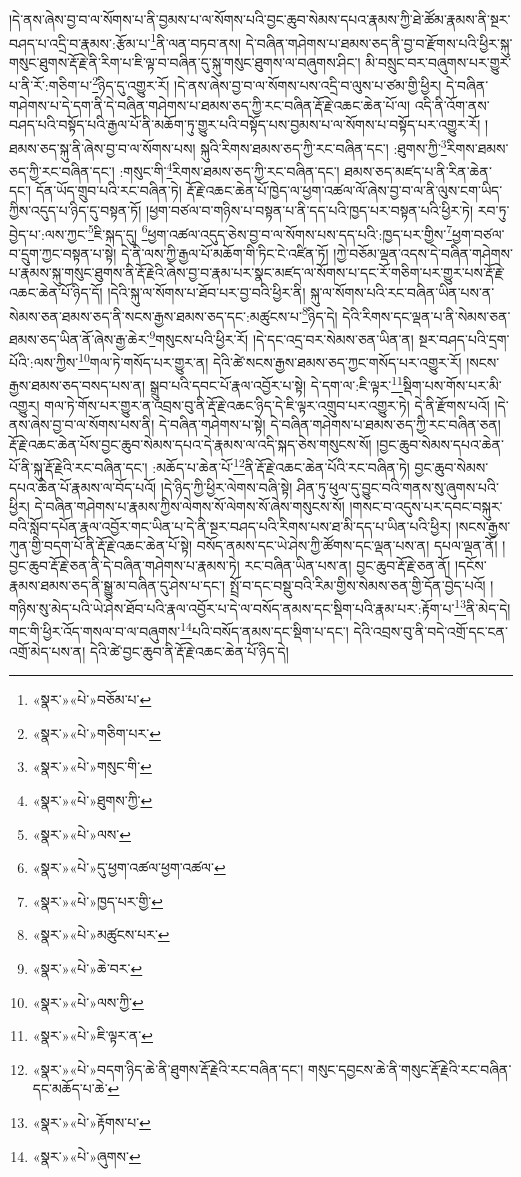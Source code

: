  །དེ་ནས་ཞེས་བྱ་བ་ལ་སོགས་པ་ནི་བྱམས་པ་ལ་སོགས་པའི་བྱང་ཆུབ་སེམས་དཔའ་རྣམས་ཀྱི་ཐེ་ཚོམ་རྣམས་ནི་སྔར་བཤད་པ་འདྲི་བ་རྣམས་:རྩོམ་པ་\footnote{«སྣར་»«པེ་»བཅོམ་པ་}ནི་ལན་བཏབ་ནས། དེ་བཞིན་གཤེགས་པ་ཐམས་ཅད་ནི་བྱ་བ་རྫོགས་པའི་ཕྱིར་སྐུ་གསུང་ཐུགས་རྡོ་རྗེ་ནི་རིག་པ་ཇི་ལྟ་བ་བཞིན་དུ་སྐུ་གསུང་ཐུགས་ལ་བཞུགས་ཤིང་། མི་བསྲུང་བར་བཞུགས་པར་གྱུར་པ་ནི་རོ་:གཅིག་པ་\footnote{«སྣར་»«པེ་»གཅིག་པར་}ཉིད་དུ་འགྱུར་རོ། །དེ་ནས་ཞེས་བྱ་བ་ལ་སོགས་པས་འདྲི་བ་ལུས་པ་ཙམ་གྱི་ཕྱིར། དེ་བཞིན་གཤེགས་པ་དེ་དག་ནི་དེ་བཞིན་གཤེགས་པ་ཐམས་ཅད་ཀྱི་རང་བཞིན་རྡོ་རྗེ་འཆང་ཆེན་པོ་ལ། འདི་ནི་འོག་ནས་བཤད་པའི་བསྟོད་པའི་རྒྱལ་པོ་ནི་མཆོག་ཏུ་གྱུར་པའི་བསྟོད་པས་བྱམས་པ་ལ་སོགས་པ་བསྟོད་པར་འགྱུར་རོ། །ཐམས་ཅད་སྐུ་ནི་ཞེས་བྱ་བ་ལ་སོགས་པས། སྐུའི་རིགས་ཐམས་ཅད་ཀྱི་རང་བཞིན་དང་། :ཐུགས་ཀྱི་\footnote{«སྣར་»«པེ་»གསུང་གི་}རིགས་ཐམས་ཅད་ཀྱི་རང་བཞིན་དང་། :གསུང་གི་\footnote{«སྣར་»«པེ་»ཐུགས་ཀྱི་}རིགས་ཐམས་ཅད་ཀྱི་རང་བཞིན་དང་། ཐམས་ཅད་མཛད་པ་ནི་རིན་ཆེན་དང་། དོན་ཡོད་གྲུབ་པའི་རང་བཞིན་ཏེ། རྡོ་རྗེ་འཆང་ཆེན་པོ་ཁྱེད་ལ་ཕྱག་འཚལ་ལོ་ཞེས་བྱ་བ་ལ་ནི་ལུས་ངག་ཡིད་ཀྱིས་འདུད་པ་ཉིད་དུ་བསྟན་ཏོ། །ཕྱག་བཙལ་བ་གཉིས་པ་བསྟན་པ་ནི་དད་པའི་ཁྱད་པར་བསྟན་པའི་ཕྱིར་ཏེ། རབ་ཏུ་བྱེད་པ་:ལས་ཀྱང་\footnote{«སྣར་»«པེ་»ལས་}ཇི་སྐད་དུ། \footnote{«སྣར་»«པེ་»དུ་ཕྱག་འཚལ་ཕྱག་འཚལ་}ཕྱག་འཚལ་འདུད་ཅེས་བྱ་བ་ལ་སོགས་པས་དད་པའི་:ཁྱད་པར་གྱིས་\footnote{«སྣར་»«པེ་»ཁྱད་པར་གྱི་}ཕྱག་བཙལ་བ་དྲུག་ཀྱང་བསྟན་པ་སྟེ། དེ་ནི་ལས་ཀྱི་རྒྱལ་པོ་མཆོག་གི་ཏིང་ངེ་འཛིན་ཏོ། །ཀྱེ་བཅོམ་ལྡན་འདས་དེ་བཞིན་གཤེགས་པ་རྣམས་སྐུ་གསུང་ཐུགས་ནི་རྡོ་རྗེའི་ཞེས་བྱ་བ་རྣམ་པར་སྣང་མཛད་ལ་སོགས་པ་དང་རོ་གཅིག་པར་གྱུར་པས་རྡོ་རྗེ་འཆང་ཆེན་པོ་ཉིད་དོ། །དེའི་སྐུ་ལ་སོགས་པ་ཐོབ་པར་བྱ་བའི་ཕྱིར་ནི། སྐུ་ལ་སོགས་པའི་རང་བཞིན་ཡིན་པས་ན་སེམས་ཅན་ཐམས་ཅད་ནི་སངས་རྒྱས་ཐམས་ཅད་དང་:མཚུངས་པ་\footnote{«སྣར་»«པེ་»མཚུངས་པར་}ཉིད་དེ། དེའི་རིགས་དང་ལྡན་པ་ནི་སེམས་ཅན་ཐམས་ཅད་ཡིན་ནོ་ཞེས་རྒྱ་ཆེར་\footnote{«སྣར་»«པེ་»ཆེ་བར་}གསུངས་པའི་ཕྱིར་རོ། །དེ་དང་འདྲ་བར་སེམས་ཅན་ཡིན་ན། སྔར་བཤད་པའི་དྲག་པོའི་:ལས་ཀྱིས་\footnote{«སྣར་»«པེ་»ལས་ཀྱི་}གལ་ཏེ་གསོད་པར་གྱུར་ན། དེའི་ཚེ་སངས་རྒྱས་ཐམས་ཅད་ཀྱང་གསོད་པར་འགྱུར་རོ། །སངས་རྒྱས་ཐམས་ཅད་བསད་པས་ན། སྒྲུབ་པའི་དབང་པོ་རྣལ་འབྱོར་པ་སྟེ། དེ་དག་ལ་:ཇི་ལྟར་\footnote{«སྣར་»«པེ་»ཇི་ལྟར་ན་}སྡིག་པས་གོས་པར་མི་འགྱུར། གལ་ཏེ་གོས་པར་གྱུར་ན་འབྲས་བུ་ནི་རྡོ་རྗེ་འཆང་ཉིད་དེ་ཇི་ལྟར་འགྲུབ་པར་འགྱུར་ཏེ། དེ་ནི་རྫོགས་པའོ། །དེ་ནས་ཞེས་བྱ་བ་ལ་སོགས་པས་ནི། དེ་བཞིན་གཤེགས་པ་སྟེ། དེ་བཞིན་གཤེགས་པ་ཐམས་ཅད་ཀྱི་རང་བཞིན་ཅན། རྡོ་རྗེ་འཆང་ཆེན་པོས་བྱང་ཆུབ་སེམས་དཔའ་དེ་རྣམས་ལ་འདི་སྐད་ཅེས་གསུངས་སོ། །བྱང་ཆུབ་སེམས་དཔའ་ཆེན་པོ་ནི་སྐུ་རྡོ་རྗེའི་རང་བཞིན་དང་། :མཆོད་པ་ཆེན་པོ་\footnote{«སྣར་»«པེ་»བདག་ཉིད་ཆེ་ནི་ཐུགས་རྡོ་རྗེའི་རང་བཞིན་དང་། གསུང་དབྱངས་ཆེ་ནི་གསུང་རྡོ་རྗེའི་རང་བཞིན་དང་མཆོད་པ་ཆེ་}ནི་རྡོ་རྗེ་འཆང་ཆེན་པོའི་རང་བཞིན་ཏེ། བྱང་ཆུབ་སེམས་དཔའ་ཆེན་པོ་རྣམས་ལ་བོད་པའོ། །དེ་ཉིད་ཀྱི་ཕྱིར་ལེགས་བཞི་སྟེ། ཤིན་ཏུ་ཕུལ་དུ་བྱུང་བའི་གནས་སུ་ཞུགས་པའི་ཕྱིར། དེ་བཞིན་གཤེགས་པ་རྣམས་ཀྱིས་ལེགས་སོ་ལེགས་སོ་ཞེས་གསུངས་སོ། །གསང་བ་འདུས་པར་དབང་བསྐུར་བའི་སློབ་དཔོན་རྣལ་འབྱོར་གང་ཡིན་པ་དེ་ནི་སྔར་བཤད་པའི་རིགས་པས་ཐ་མི་དད་པ་ཡིན་པའི་ཕྱིར། །སངས་རྒྱས་ཀུན་གྱི་བདག་པོ་ནི་རྡོ་རྗེ་འཆང་ཆེན་པོ་སྟེ། བསོད་ནམས་དང་ཡེ་ཤེས་ཀྱི་ཚོགས་དང་ལྡན་པས་ན། དཔལ་ལྡན་ནོ། །བྱང་ཆུབ་རྡོ་རྗེ་ཅན་ནི་དེ་བཞིན་གཤེགས་པ་རྣམས་ཏེ། རང་བཞིན་ཡིན་པས་ན། བྱང་ཆུབ་རྡོ་རྗེ་ཅན་ནོ། །དངོས་རྣམས་ཐམས་ཅད་ནི་སྒྱུ་མ་བཞིན་དུ་ཤེས་པ་དང་། སྤྲོ་བ་དང་བསྡུ་བའི་རིམ་གྱིས་སེམས་ཅན་གྱི་དོན་བྱེད་པའོ། །གཉིས་སུ་མེད་པའི་ཡེ་ཤེས་ཐོབ་པའི་རྣལ་འབྱོར་པ་དེ་ལ་བསོད་ནམས་དང་སྡིག་པའི་རྣམ་པར་:རྟོག་པ་\footnote{«སྣར་»«པེ་»རྟོགས་པ་}ནི་མེད་དེ། གང་གི་ཕྱིར་འོད་གསལ་བ་ལ་བཞུགས་\footnote{«སྣར་»«པེ་»ཞུགས་}པའི་བསོད་ནམས་དང་སྡིག་པ་དང་། དེའི་འབྲས་བུ་ནི་བདེ་འགྲོ་དང་ངན་འགྲོ་མེད་པས་ན། དེའི་ཚེ་བྱང་ཆུབ་ནི་རྡོ་རྗེ་འཆང་ཆེན་པོ་ཉིད་དེ། 